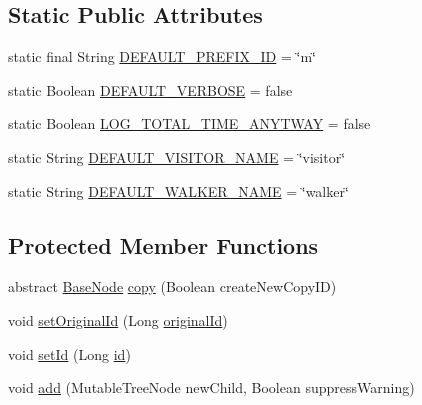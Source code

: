 \subsection*{Static Public Attributes}
\begin{DoxyCompactItemize}
\item 
static final String \hyperlink{classit_1_1emarolab_1_1cagg_1_1core_1_1BaseNode_ab1b67d800fbb127b6e95d27c6c936f1d}{D\-E\-F\-A\-U\-L\-T\-\_\-\-P\-R\-E\-F\-I\-X\-\_\-\-I\-D} = \char`\"{}m\char`\"{}
\item 
static Boolean \hyperlink{classit_1_1emarolab_1_1cagg_1_1core_1_1BaseNode_a800cf0002fa8eb5d2e1a1efc798e9d3d}{D\-E\-F\-A\-U\-L\-T\-\_\-\-V\-E\-R\-B\-O\-S\-E} = false
\item 
static Boolean \hyperlink{classit_1_1emarolab_1_1cagg_1_1core_1_1BaseNode_af2c0c0c449f10cb72892b6df42f4e4a8}{L\-O\-G\-\_\-\-T\-O\-T\-A\-L\-\_\-\-T\-I\-M\-E\-\_\-\-A\-N\-Y\-T\-W\-A\-Y} = false
\item 
static String \hyperlink{classit_1_1emarolab_1_1cagg_1_1core_1_1BaseNode_ac48c006848405146428a0c553e43429e}{D\-E\-F\-A\-U\-L\-T\-\_\-\-V\-I\-S\-I\-T\-O\-R\-\_\-\-N\-A\-M\-E} = \char`\"{}visitor\char`\"{}
\item 
static String \hyperlink{classit_1_1emarolab_1_1cagg_1_1core_1_1BaseNode_af4c8492c4126c6b336993d47448fd0ad}{D\-E\-F\-A\-U\-L\-T\-\_\-\-W\-A\-L\-K\-E\-R\-\_\-\-N\-A\-M\-E} = \char`\"{}walker\char`\"{}
\end{DoxyCompactItemize}
\subsection*{Protected Member Functions}
\begin{DoxyCompactItemize}
\item 
abstract \hyperlink{classit_1_1emarolab_1_1cagg_1_1core_1_1BaseNode}{Base\-Node} \hyperlink{classit_1_1emarolab_1_1cagg_1_1core_1_1BaseNode_a8a9d55c02c90bb06c8f37d7b976cc11c}{copy} (Boolean create\-New\-Copy\-I\-D)
\item 
void \hyperlink{classit_1_1emarolab_1_1cagg_1_1core_1_1BaseNode_a7b7c9533b6174764ff1f631504985d43}{set\-Original\-Id} (Long \hyperlink{classit_1_1emarolab_1_1cagg_1_1core_1_1BaseNode_a6a3d93e1d8a6fa71aeded8749347da7c}{original\-Id})
\item 
void \hyperlink{classit_1_1emarolab_1_1cagg_1_1core_1_1BaseNode_aa6e5ed85e9e68ca715a1588ec0707546}{set\-Id} (Long \hyperlink{classit_1_1emarolab_1_1cagg_1_1core_1_1BaseNode_ace8dafa005681888ca194c9f02e6f9cf}{id})
\item 
void \hyperlink{classit_1_1emarolab_1_1cagg_1_1core_1_1BaseNode_a1236fd1a41b8bfebc6ac31707a0772de}{add} (Mutable\-Tree\-Node new\-Child, Boolean suppress\-Warning)
\end{DoxyCompactItemize}
